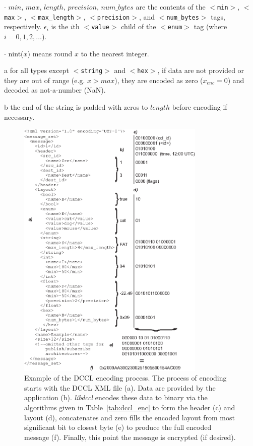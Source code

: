 \documentclass[11pt, letterpaper, oneside]{memoir}
\newcommand{\xmltag}[1]{\texttt{$<$#1$>$}}
\begin{document}
\begin{itemize}
\begin{table}[!t]
\begin{threeparttable}
\begin{tablenotes}
\item $\cdot$ $min$, $max$, $length$, $precision$, $num\_bytes$ are the contents of the \xmltag{min}, \xmltag{max}, \xmltag{max\_length}, \xmltag{precision}, and \xmltag{num\_bytes} tags, respectively. $\epsilon_i$ is the $i$th \xmltag{value} child of the \xmltag{enum} tag (where $i = 0, 1, 2, \ldots$).
\item $\cdot$ nint($x$) means round $x$ to the nearest integer.
\item[a] for all types except \xmltag{string} and \xmltag{hex}, if data are not provided or they are out of range (e.g. $x > max$), they are encoded as zero ($x_{enc} = 0$) and decoded as not-a-number (NaN).
\item[b] the end of the string is padded with zeros to $length$ before encoding if necessary.
\end{tablenotes}
\end{threeparttable}
\end{table}


\begin{figure}
\centering
\includegraphics[width=0.8\textwidth]{dccl_example}
\caption{Example of the DCCL encoding process. The process of encoding starts with the DCCL XML file (a). Data are provided by the application (b). \textit{libdccl} encodes these data to binary via the algorithms given in Table~\ref{tab:dccl_enc} to form the header (c) and layout (d), concatenates and zero fills the encoded layout from most significant bit to closest byte (e) to produce the full encoded message (f). Finally, this point the message is encrypted (if desired). }
\label{fig:dccl_example}
\end{figure}





\end{itemize}
\end{document}
